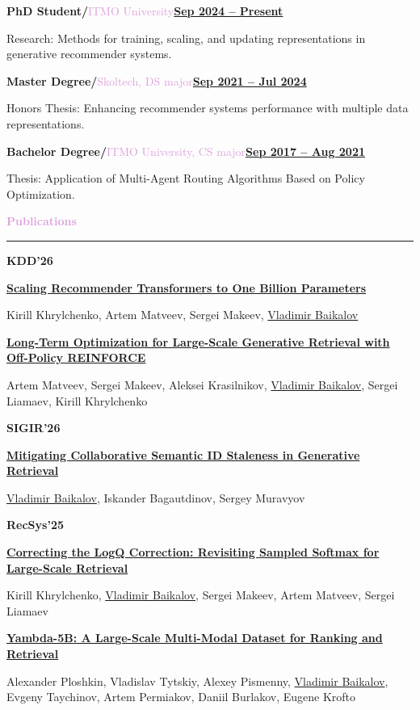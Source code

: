 \documentclass[12pt,a4paper]{extarticle}
\newcommand{\cvsection}[1]{%
    \vspace{1mm}
    \par\noindent\hbox{\Large{\textcolor{Plum}
    {\textbf{#1}}}}\vspace{2mm}\hrule\vspace{2mm}
}
\newcommand{\edu}[3]{%
    \noindent\textbf{\large{#1/}}\textcolor{Plum}{#2}\hfill\textbf{\underline{#3}}
}
\newcommand{\pubfirst}[3]{%
    \vspace{1mm}
    \noindent
    \begin{minipage}[t]{24mm}
        \textbf{\large #1}
    \end{minipage}%
    \hspace{3mm}%
    \begin{minipage}[t]{\dimexpr\linewidth-30mm\relax}
        {\large\textbf{#2}}\par
        \vspace{0.8mm}
        #3
    \end{minipage}
    \par\vspace{3mm}
}
\newcommand{\pubnext}[2]{%
    \noindent
    \hspace*{27mm}%
    \begin{minipage}[t]{\dimexpr\linewidth-33mm\relax}
        {\large\textbf{#1}}\par
        \vspace{0.8mm}
        #2
    \end{minipage}
    \par\vspace{3mm}
}
\begin{document}
\edu{PhD Student}{ITMO University}{Sep 2024 -- Present}

{\leftskip=3mm
    
    Research: Methods for training, scaling, and updating representations in generative recommender systems. 

    \vspace{2mm}
}



\edu{Master Degree}{Skoltech, DS major}{Sep 2021 -- Jul 2024}

{\leftskip=3mm

    Honors Thesis: Enhancing recommender systems performance with multiple data representations.

    \vspace{2mm}
}

\edu{Bachelor Degree}{ITMO University, CS major}{Sep 2017 -- Aug 2021}

{\leftskip=3mm

    Thesis: Application of Multi-Agent Routing Algorithms Based on Policy Optimization.

    \vspace{2mm}
}

\cvsection{Publications}

\vspace{1mm}

\pubfirst{KDD'26}
{\href{https://arxiv.org/abs/2507.15994}{Scaling Recommender Transformers to One Billion Parameters}}
{Kirill Khrylchenko, Artem Matveev, Sergei Makeev, \underline{Vladimir Baikalov}}

\pubnext
{\href{https://arxiv.org/abs/2607.02818}{Long-Term Optimization for Large-Scale Generative Retrieval with Off-Policy REINFORCE}}
{Artem Matveev, Sergei Makeev, Aleksei Krasilnikov, \underline{Vladimir Baikalov}, Sergei Liamaev, Kirill Khrylchenko}

\pubfirst{SIGIR'26}
{\href{https://arxiv.org/abs/2604.13273}{Mitigating Collaborative Semantic ID Staleness in Generative Retrieval}}
{\underline{Vladimir Baikalov}, Iskander Bagautdinov, Sergey Muravyov}

\pubfirst{RecSys'25}
{\href{https://dl.acm.org/doi/abs/10.1145/3705328.3748033}{Correcting the LogQ Correction: Revisiting Sampled Softmax for Large-Scale Retrieval}}
{Kirill Khrylchenko, \underline{Vladimir Baikalov}, Sergei Makeev, Artem Matveev, Sergei Liamaev}

\pubnext
{\href{https://dl.acm.org/doi/abs/10.1145/3705328.3748163}{Yambda-5B: A Large-Scale Multi-Modal Dataset for Ranking and Retrieval}}
{Alexander Ploshkin, Vladislav Tytskiy, Alexey Pismenny, \underline{Vladimir Baikalov}, Evgeny Taychinov, Artem Permiakov, Daniil Burlakov, Eugene Krofto}
\end{document}
